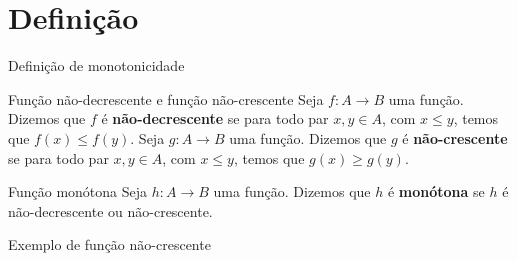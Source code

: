 \section{Definição}

\begin{frame}[fragile]{Definição de monotonicidade}

    \begin{block}{Função não-decrescente e função não-crescente}
        Seja $f: A\to B$ uma função. Dizemos que $f$ é \textbf{não-decrescente} se para todo par
            $x, y\in A$, com $x\leq y$, temos que $f(x)\leq f(y)$. \newline\newline
        Seja $g: A\to B$ uma função. Dizemos que $g$ é \textbf{não-crescente} se para todo par
            $x, y\in A$, com $x\leq y$, temos que $g(x)\geq g(y)$.
    \end{block}

    \vspace{0.2in}
    \begin{block}{Função monótona}
        Seja $h: A\to B$ uma função. Dizemos que $h$ é \textbf{monótona} se $h$ é não-decrescente ou
            não-crescente.
    \end{block}

\end{frame}

\begin{frame}[fragile]{Exemplo de função não-crescente}

    \begin{figure}
        \centering


    \end{figure}
\end{frame}

